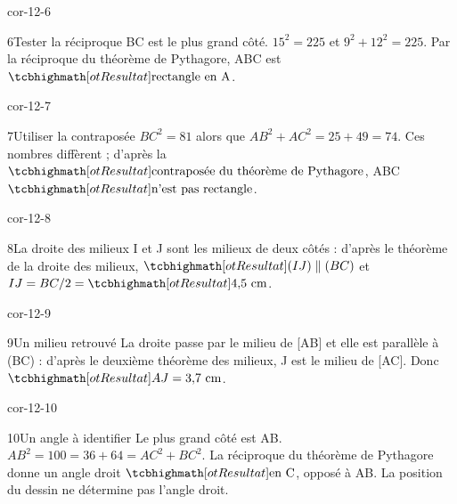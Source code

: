 \begin{blocLivre}{cor-12-6}\begin{corrige}{6}{Tester la réciproque}
BC est le plus grand côté. $15^2=225$ et $9^2+12^2=225$. Par la réciproque du théorème de Pythagore, ABC est $\res{\text{rectangle en A}}$.
\label{fig-cor-12-6}
\end{corrige}\end{blocLivre}
\begin{blocLivre}{cor-12-7}\begin{corrige}{7}{Utiliser la contraposée}
$BC^2=81$ alors que $AB^2+AC^2=25+49=74$. Ces nombres diffèrent ; d’après la $\res{\text{contraposée du théorème de Pythagore}}$, ABC $\res{\text{n’est pas rectangle}}$.
\label{fig-cor-12-7}
\end{corrige}\end{blocLivre}
\begin{blocLivre}{cor-12-8}\begin{corrige}{8}{La droite des milieux}
I et J sont les milieux de deux côtés : d’après le théorème de la droite des milieux, $\res{(IJ)\parallel(BC)}$ et $IJ=BC/2=\res{4{,}5\text{ cm}}$.
\label{fig-cor-12-8}
\end{corrige}\end{blocLivre}
\begin{blocLivre}{cor-12-9}\begin{corrige}{9}{Un milieu retrouvé}
La droite passe par le milieu de [AB] et elle est parallèle à (BC) : d’après le deuxième théorème des milieux, J est le milieu de [AC]. Donc $\res{AJ=3{,}7\text{ cm}}$.
\label{fig-cor-12-9}
\end{corrige}\end{blocLivre}
\begin{blocLivre}{cor-12-10}\begin{corrige}{10}{Un angle à identifier}
Le plus grand côté est AB. $AB^2=100=36+64=AC^2+BC^2$. La réciproque du théorème de Pythagore donne un angle droit $\res{\text{en C}}$, opposé à AB. La position du dessin ne détermine pas l’angle droit.
\label{fig-cor-12-10}
\end{corrige}\end{blocLivre}

